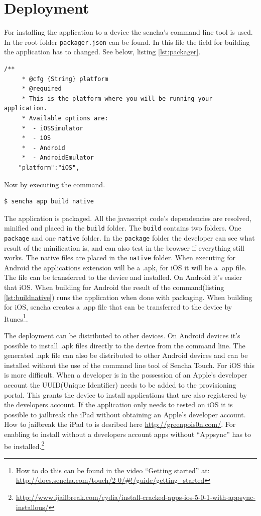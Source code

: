 \section{Deployment}
For installing the application to a device the sencha's command line tool is used. In the root folder \texttt{packager.json} can be found. In this file the field for building the application has to changed. See below, listing \ref{lst:packager}.
\begin{lstlisting}[caption={packager.json},label={lst:packager}]
	/**
	 * @cfg {String} platform
	 * @required
	 * This is the platform where you will be running your application.
	 * Available options are:
	 *  - iOSSimulator
	 *  - iOS
	 *  - Android
	 *  - AndroidEmulator
	"platform":"iOS",
\end{lstlisting}
Now by executing the command.
\label{appnative}
\begin{lstlisting}[caption={command to build native},label={lst:buildnative}]
$ sencha app build native
\end{lstlisting}
The application is packaged. All the javascript code's dependencies are resolved, minified and placed in the \texttt{build} folder. The \texttt{build} contains two folders. One \texttt{package} and one \texttt{native} folder. In the \texttt{package} folder the developer can see what result of the minification is, and can also test in the browser if everything still works. The native files are placed in the \texttt{native} folder. When executing for Android the applications extension will be a .apk, for iOS it will be a .app file.  The file can be transferred to the device and installed. On Android it's easier that iOS. When building for Android the result of the command(listing \ref{lst:buildnative}) runs the application when done with packaging. When building for iOS, sencha creates a .app file that can be transferred to the device by Itunes\footnote{How to do this can be found in the video ``Getting started'' at: \url{http://docs.sencha.com/touch/2-0/\#!/guide/getting\_started}}.

The deployment can be distributed to other devices. On Android devices it's possible to install .apk files directly to the device from the command line. The generated .apk file can also be distributed to other Android devices and can be installed without the use of the command line tool of Sencha Touch.
For iOS this is more difficult. When a developer is in the possession of an Apple's developer account the UUID(Unique Identifier) needs to be added to the provisioning portal. This grants the device to install applications that are also registered by the developers account. If the application only needs to tested on iOS it is possible to jailbreak the iPad without obtaining an Apple's developer account. How to jailbreak the iPad to is desribed here \url{http://greenpois0n.com/}. For enabling to install without a developers account apps without ``Appsync'' has to be installed.\footnote{\url{http://www.ijailbreak.com/cydia/install-cracked-apps-ios-5-0-1-with-appsync-installous/}}

